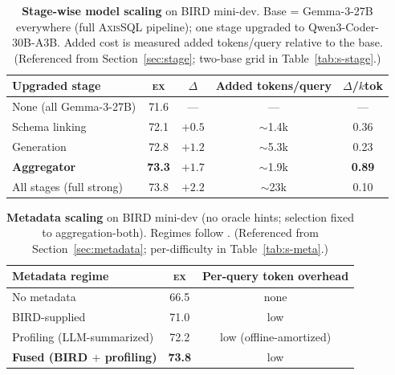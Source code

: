 \documentclass{article}
\newcommand{\sys}{\textsc{AxisSQL}\xspace}
\newcommand{\ex}{\textsc{ex}\xspace}
\newcommand{\bestcell}[1]{\textbf{#1}}
\begin{document}
\begin{table}[h]
\centering
\small
\caption{\textbf{Stage-wise model scaling} on BIRD mini-dev. Base = Gemma-3-27B everywhere (full \sys{} pipeline); one stage upgraded to Qwen3-Coder-30B-A3B. Added cost is measured added tokens/query relative to the base. (Referenced from Section~\ref{sec:stage}; two-base grid in Table~\ref{tab:s-stage}.)}
\label{tab:stage}
\begin{tabular}{@{}lcccc@{}}
\toprule
\textbf{Upgraded stage} & \textbf{\ex} & \textbf{$\Delta$} & \textbf{Added tokens/query} & \textbf{$\Delta$/$k$tok} \\
\midrule
None (all Gemma-3-27B)         & 71.6 & ---   & --- & --- \\
Schema linking                  & 72.1 & $+0.5$ & $\sim$1.4k & 0.36 \\
Generation                      & 72.8 & $+1.2$ & $\sim$5.3k & 0.23 \\
\textbf{Aggregator}             & \bestcell{73.3} & $\mathbf{+1.7}$ & $\sim$1.9k & \textbf{0.89} \\
All stages (full strong)        & 73.8 & $+2.2$ & $\sim$23k & 0.10 \\
\bottomrule
\end{tabular}
\end{table}

\begin{table}[h]
\centering
\small
\caption{\textbf{Metadata scaling} on BIRD mini-dev (no oracle hints; selection fixed to aggregation-both). Regimes follow \citet{shkapenyuk2025metadata}. (Referenced from Section~\ref{sec:metadata}; per-difficulty in Table~\ref{tab:s-meta}.)}
\label{tab:metadata}
\begin{tabular}{@{}lcc@{}}
\toprule
\textbf{Metadata regime} & \textbf{\ex} & \textbf{Per-query token overhead} \\
\midrule
No metadata                 & 66.5 & none \\
BIRD-supplied               & 71.0 & low \\
Profiling (LLM-summarized)  & 72.2 & low (offline-amortized) \\
\textbf{Fused (BIRD $+$ profiling)} & \bestcell{73.8} & low \\
\bottomrule
\end{tabular}
\end{table}
\end{document}
